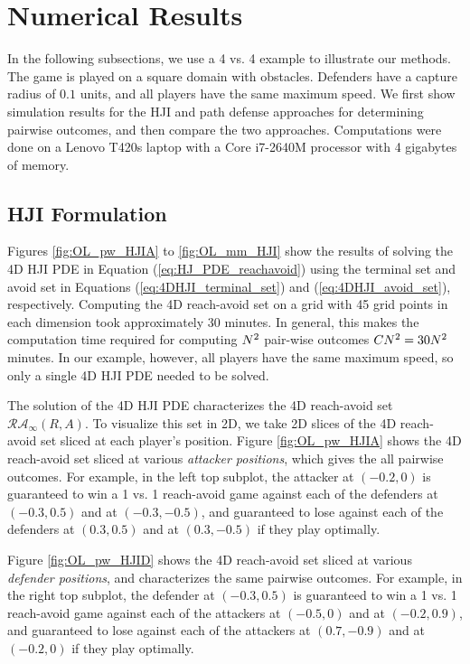\section{Numerical Results}
\label{sec:simulation}
In the following subsections, we use a 4 vs. 4 example to illustrate our methods. The game is played on a square domain with obstacles. Defenders have a capture radius of $0.1$ units, and all players have the same maximum speed. We first show simulation results for the HJI and path defense approaches for determining pairwise outcomes, and then compare the two approaches. Computations were done on a Lenovo T420s laptop with a Core i7-2640M processor with 4 gigabytes of memory.

\subsection{HJI Formulation}
Figures \ref{fig:OL_pw_HJIA} to \ref{fig:OL_mm_HJI} show the results of solving the 4D HJI PDE in Equation (\ref{eq:HJ_PDE_reachavoid}) using the terminal set and avoid set in Equations (\ref{eq:4DHJI_terminal_set}) and (\ref{eq:4DHJI_avoid_set}), respectively. Computing the 4D reach-avoid set on a grid with 45 grid points in each dimension took approximately 30 minutes. In general, this makes the computation time required for computing $N^2$ pair-wise outcomes $C N^2 = 30 N^2$ minutes. In our example, however, all players have the same maximum speed, so only a single 4D HJI PDE needed to be solved.

The solution of the 4D HJI PDE characterizes the 4D reach-avoid set $\mathcal{RA}_\infty(R,A)$. To visualize this set in 2D, we take 2D slices of the 4D reach-avoid set sliced at each player's position. Figure \ref{fig:OL_pw_HJIA} shows the 4D reach-avoid set sliced at various \textit{attacker positions}, which gives the all pairwise outcomes. For example, in the left top subplot, the attacker at $(-0.2, 0)$ is guaranteed to win a 1 vs. 1 reach-avoid game against each of the defenders at $(-0.3, 0.5)$ and at $(-0.3, -0.5)$, and guaranteed to lose against each of the defenders at $(0.3, 0.5)$ and at $(0.3, -0.5)$ if they play optimally.

Figure \ref{fig:OL_pw_HJID} shows the 4D reach-avoid set sliced at various \textit{defender positions}, and characterizes the same pairwise outcomes. For example,  in the right top subplot, the defender at $(-0.3, 0.5)$ is guaranteed to win a 1 vs. 1 reach-avoid game against each of the attackers at $(-0.5, 0)$ and at $(-0.2, 0.9)$, and guaranteed to lose against each of the attackers at $(0.7, -0.9)$ and at $(-0.2, 0)$ if they play optimally.

